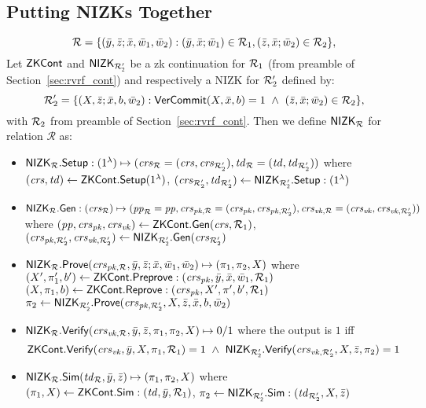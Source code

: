 \subsection{Putting NIZKs Together}
$$\rel = \{(\bary, \barz; \barx, \baromega_1, \baromega_2):  (\bary, \barx; \baromega_1) \in \relone, (\barz, \barx; \baromega_2) \in \reltwo \},$$
Let $\ZKCont$ and $\nizktwo$ be a zk continuation for $\relone$ (from preamble of Section~\ref{sec:rvrf_cont}) and respectively a NIZK 
for $\reltwo'$ defined by:
$$\reltwo' = \{(X, \barz; \barx, b, \baromega_2): \VerifyCom(X, \barx, b) =1 \ \wedge \ (\barz, \barx; \baromega_2) \in \reltwo \},$$
\noindent with $\reltwo$ from preamble of Section~\ref{sec:rvrf_cont}. Then we define $\nizkR$ for relation $\mathcal{R}$ as:
\begin{itemize}
\item $\nizkR.\Setup: (1^{\lambda}) \mapsto (\crsR = (\crs,\crstwo), \twR = (\tw, \twtwo))$ where \\
$(\crs, \tw) \leftarrow \ZKCont.\Setup(1^{\lambda})$, $(\crstwo, \twtwo) \leftarrow \nizktwo.\Setup: (1^{\lambda})$

\item $\nizkR.\Gen: (\crsR) \mapsto (\ppR = \pp, \crspkR = (\crspk,\crspktwo), \crsvkR = (\crsvk,\crsvktwo))$ where 
$(\pp, \crspk, \crsvk) \leftarrow \ZKCont.\Gen(\crs, \relone)$, \\ $(\crspktwo, \crsvktwo) \leftarrow \nizktwo.\Gen(\crstwo)$ 

\item $\nizkR.\Prove(\crspkR,\bary, \barz; \barx, \baromega_1, \baromega_2 ) \mapsto (\pi_1, \pi_2, X)$ where \\
$(X', \pi'_1, b')\leftarrow \ZKCont.\Preprove:(\crspk, \bar{y}, \bar{x}, \baromega_1, \relone)$ \\
$(X, \pi_1, b) \leftarrow \ZKCont.\Reprove: (\crspk, X', \pi', b', \relone)$ \\
$ \pi_2 \leftarrow \nizktwo.\Prove(\crspktwo, X, \barz, \barx, b, \baromega_2)$ 

\item $\nizkR.\Verify(\crsvkR,\bary, \barz, \pi_1, \pi_2, X) \mapsto 0/1$ where the output is $1$ iff 
$$\ZKCont.\Verify(\crsvk, \bar{y}, X, \pi_1, \relone) = 1 \  \wedge \ \nizktwo.\Verify(\crsvktwo, X, \barz, \pi_2) =1$$

\item $\nizkR.\Sim(\twR, \bary, \barz) \mapsto (\pi_1, \pi_2, X)$ where \\
$(\pi_1, X) \leftarrow \ZKCont.\Sim: (\tw, \bary, \relone)$, $\pi_2 \leftarrow \nizktwo.\Sim: (\twtwo, X, \barz)$ 
 \end{itemize}

